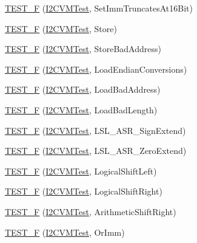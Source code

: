 \begin{DoxyCompactItemize}
\item 
\hyperlink{group___unit_tests_ga00fc2472f93dc16ff718689f8fbdcda2}{\-T\-E\-S\-T\-\_\-\-F} (\hyperlink{class_i2_c_v_m_test}{\-I2\-C\-V\-M\-Test}, \-Set\-Imm\-Truncates\-At16\-Bit)
\item 
\hyperlink{group___unit_tests_gaef630d690ed99e8cf216b0f72fdd5b23}{\-T\-E\-S\-T\-\_\-\-F} (\hyperlink{class_i2_c_v_m_test}{\-I2\-C\-V\-M\-Test}, \-Store)
\item 
\hyperlink{group___unit_tests_ga05800e4f670392f78853e4827e13f691}{\-T\-E\-S\-T\-\_\-\-F} (\hyperlink{class_i2_c_v_m_test}{\-I2\-C\-V\-M\-Test}, \-Store\-Bad\-Address)
\item 
\hyperlink{group___unit_tests_gad3289332928cfabc7cabe596aa42dd73}{\-T\-E\-S\-T\-\_\-\-F} (\hyperlink{class_i2_c_v_m_test}{\-I2\-C\-V\-M\-Test}, \-Load\-Endian\-Conversions)
\item 
\hyperlink{group___unit_tests_ga1126eb2ccff40800bc0d5c308004e807}{\-T\-E\-S\-T\-\_\-\-F} (\hyperlink{class_i2_c_v_m_test}{\-I2\-C\-V\-M\-Test}, \-Load\-Bad\-Address)
\item 
\hyperlink{group___unit_tests_gad868321881cf4fae0a9d11c16ad273a5}{\-T\-E\-S\-T\-\_\-\-F} (\hyperlink{class_i2_c_v_m_test}{\-I2\-C\-V\-M\-Test}, \-Load\-Bad\-Length)
\item 
\hyperlink{group___unit_tests_ga4b43e2486591995a9870ffe8b97ff0af}{\-T\-E\-S\-T\-\_\-\-F} (\hyperlink{class_i2_c_v_m_test}{\-I2\-C\-V\-M\-Test}, \-L\-S\-L\-\_\-\-A\-S\-R\-\_\-\-Sign\-Extend)
\item 
\hyperlink{group___unit_tests_gaceb71a0ba1b5cb9e7dddf188c05833cb}{\-T\-E\-S\-T\-\_\-\-F} (\hyperlink{class_i2_c_v_m_test}{\-I2\-C\-V\-M\-Test}, \-L\-S\-L\-\_\-\-A\-S\-R\-\_\-\-Zero\-Extend)
\item 
\hyperlink{group___unit_tests_ga727b6097a9d881f2333caf01add8f616}{\-T\-E\-S\-T\-\_\-\-F} (\hyperlink{class_i2_c_v_m_test}{\-I2\-C\-V\-M\-Test}, \-Logical\-Shift\-Left)
\item 
\hyperlink{group___unit_tests_ga3e5c552462de21f6f63035ab3dab4408}{\-T\-E\-S\-T\-\_\-\-F} (\hyperlink{class_i2_c_v_m_test}{\-I2\-C\-V\-M\-Test}, \-Logical\-Shift\-Right)
\item 
\hyperlink{group___unit_tests_ga5ddec420dc153ad632f5e0e3c85c7336}{\-T\-E\-S\-T\-\_\-\-F} (\hyperlink{class_i2_c_v_m_test}{\-I2\-C\-V\-M\-Test}, \-Arithmetic\-Shift\-Right)
\item 
\hyperlink{group___unit_tests_gaab9d848ac09c9188a76aefedde95f0d9}{\-T\-E\-S\-T\-\_\-\-F} (\hyperlink{class_i2_c_v_m_test}{\-I2\-C\-V\-M\-Test}, \-Or\-Imm)

\end{DoxyCompactItemize}
